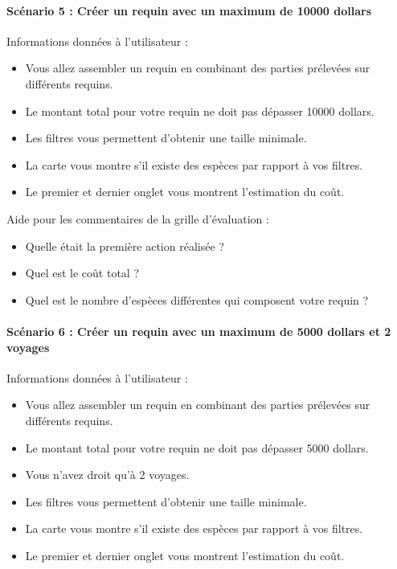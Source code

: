 \documentclass{article}
\begin{document}
\paragraph{Scénario 5 : Créer un requin avec un maximum de 10000 dollars}

Informations données à l'utilisateur :
\begin{itemize}
	\item Vous allez assembler un requin en combinant des parties prélevées sur différents requins.
	\item Le montant total pour votre requin ne doit pas dépasser 10000 dollars.
	\item Les filtres vous permettent d'obtenir une taille minimale.
	\item La carte vous montre s'il existe des espèces par rapport à vos filtres.
	\item Le premier et dernier onglet vous montrent l'estimation du coût.
\end{itemize}

Aide pour les commentaires de la grille d'évaluation :
\begin{itemize}
	\item Quelle était la première action réalisée ?
	\item Quel est le coût total ?
	\item Quel est le nombre d'espèces différentes qui composent votre requin ?
\end{itemize}

\paragraph{Scénario 6 : Créer un requin avec un maximum de 5000 dollars et 2 voyages}

Informations données à l'utilisateur :
\begin{itemize}
	\item Vous allez assembler un requin en combinant des parties prélevées sur différents requins.
	\item Le montant total pour votre requin ne doit pas dépasser 5000 dollars.
	\item Vous n'avez droit qu'à 2 voyages.
	\item Les filtres vous permettent d'obtenir une taille minimale.
	\item La carte vous montre s'il existe des espèces par rapport à vos filtres.
	\item Le premier et dernier onglet vous montrent l'estimation du coût.
\end{itemize}
\end{document}

